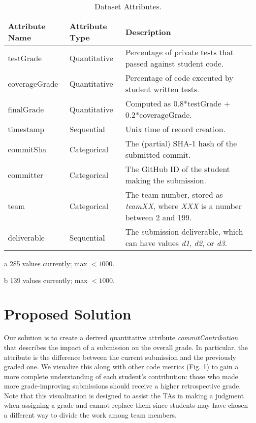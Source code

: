 \documentclass[preprint,journal]{vgtc}       %
\begin{document}
\begin{table*}[t]
  \label{tab:attributes}
  \centering
  \begin{threeparttable}
      \caption{Dataset Attributes.}
  \begin{tabular*}{\textwidth}{lll}
    \hline
    \textbf{Attribute Name} & \textbf{Attribute Type} & \textbf{Description} \\
    \hline
    testGrade      & Quantitative & Percentage of private tests that passed against student code. \\
    coverageGrade  & Quantitative & Percentage of code executed by student written tests. \\
    finalGrade     & Quantitative & Computed as 0.8*testGrade + 0.2*coverageGrade. \\
    timestamp      & Sequential   & Unix time of record creation. \\
    commitSha      & Categorical  & The (partial) SHA-1 hash of the submitted commit. \\
    committer      & Categorical\tnote{a}  & The GitHub ID of the student making the submission. \\
    team           & Categorical\tnote{b}  & The team number, stored as \textit{teamXX}, where \textit{XXX} is a number between 2 and 199. \\
    deliverable    & Sequential   & The submission deliverable, which can have values \textit{d1}, \textit{d2}, or \textit{d3}. \\
    \hline
  \end{tabular*}
  \begin{tablenotes}\footnotesize
    \item [a] 285 values currently; max $<1000$.
    \item [b] 139 values currently; max $<1000$.
\end{tablenotes}
\end{threeparttable}
\end{table*}

\section{Proposed Solution}
Our solution is to create a derived quantitative attribute \textit{commitContribution} that describes
the impact of a submission on the overall grade. In particular, the attribute is
the difference between the current submission and the previously graded one. We
visualize this along with other code metrics (Fig. 1) to gain a more
complete understanding of each student's contribution: those who made more grade-improving
submissions should receive a higher retrospective grade. Note that this visualization
is designed to assist the TAs in
making a judgment when assigning a grade and cannot replace them since students may
have chosen a different way to divide the work among team members.
\end{document}
